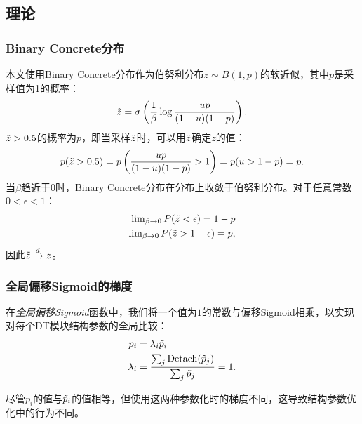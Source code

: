 \subsection{理论}
\subsubsection{Binary Concrete分布}
\label{app:theory:BCD}
本文使用Binary Concrete分布作为伯努利分布$z\sim B(1,p)$的软近似，其中$p$是采样值为1的概率：
\begin{equation}
    \Tilde{z} = \sigma\left(\frac1\beta \operatorname{log}\frac{up}{(1-u)(1-p)}\right).
\end{equation}
$\Tilde{z}>0.5$的概率为$p$，即当采样$\Tilde{z}$时，可以用$\Tilde{z}$确定$z$的值：
\begin{equation}
    p(\Tilde{z}>0.5) = p\left(\frac{up}{(1-u)(1-p)}>1\right) = p(u>1-p) = p.
\end{equation}
当$\beta$趋近于$0$时，Binary Concrete分布在分布上收敛于伯努利分布。对于任意常数$0<\epsilon<1$：
\begin{align}
    \operatorname{lim}_{\beta\rightarrow 0} P(\Tilde{z}<\epsilon) = 1-p \\
    \operatorname{lim}_{\beta\rightarrow 0} P(\Tilde{z}>1-\epsilon) = p,
\end{align}
因此$\Tilde{z} \xrightarrow{d} z$。


\subsubsection{全局偏移Sigmoid的梯度}
\label{app:Gradient}
在\emph{全局偏移Sigmoid}函数中，我们将一个值为$1$的常数与偏移Sigmoid相乘，以实现对每个DT模块结构参数的全局比较：
\begin{align}
    {p_i} & = \lambda_i \Tilde{p}_i \\
    \lambda_i & = \frac{\sum_j \operatorname{Detach}( \Tilde{p}_j)}{\sum_j  \Tilde{p}_j}=1.
\end{align}

尽管$p_i$的值与$\Tilde{p}_i$的值相等，但使用这两种参数化时的梯度不同，这导致结构参数优化中的行为不同。

